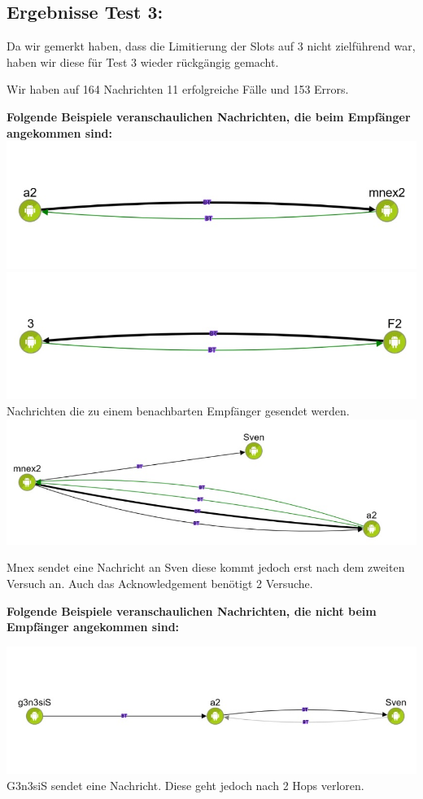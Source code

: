 \clearpage\subsection{Ergebnisse Test 3:}\label{ergebnisse-test-3}

Da wir gemerkt haben, dass die Limitierung der Slots auf 3 nicht
zielführend war, haben wir diese für Test 3 wieder rückgängig gemacht.

Wir haben auf 164 Nachrichten 11 erfolgreiche Fälle und 153 Errors.

\textbf{Folgende Beispiele veranschaulichen Nachrichten, die beim
Empfänger angekommen sind:}
\includegraphics{belege/grosstests/Bilder/Grosstest2/Test3Erfolg1.jpg}
\includegraphics{belege/grosstests/Bilder/Grosstest2/Test3Erfolg2.jpg}
Nachrichten die zu einem benachbarten Empfänger gesendet werden.
\includegraphics{belege/grosstests/Bilder/Grosstest2/Test3Erfolg3.jpg}

Mnex sendet eine Nachricht an Sven diese kommt jedoch erst nach dem
zweiten Versuch an. Auch das Acknowledgement benötigt 2 Versuche.

\textbf{Folgende Beispiele veranschaulichen Nachrichten, die nicht beim
Empfänger angekommen sind:}

\includegraphics{belege/grosstests/Bilder/Grosstest2/Test3Misserfolg1.jpg}
G3n3siS sendet eine Nachricht. Diese geht jedoch nach 2 Hops verloren.

